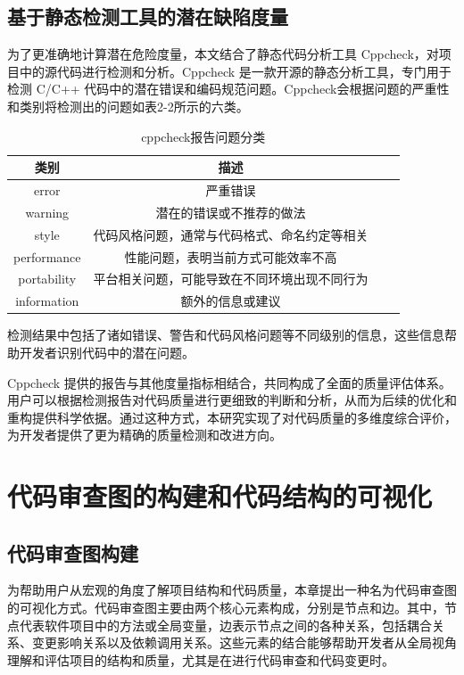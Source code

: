 \subsection{基于静态检测工具的潜在缺陷度量}

为了更准确地计算潜在危险度量，本文结合了静态代码分析工具 Cppcheck，对项目中的源代码进行检测和分析。Cppcheck 是一款开源的静态分析工具，专门用于检测 C/C++ 代码中的潜在错误和编码规范问题。Cppcheck会根据问题的严重性和类别将检测出的问题如表2-2所示的六类。

\begin{table}[htbp]
\caption{cppcheck报告问题分类}
\vspace{0.5em}\centering\wuhao
\begin{tabular}{cccc}
\toprule
类别 & 描述 \\
\midrule
error &  严重错误 \\
warning & 潜在的错误或不推荐的做法 \\
style & 代码风格问题，通常与代码格式、命名约定等相关 \\
performance & 性能问题，表明当前方式可能效率不高 \\ 
portability & 平台相关问题，可能导致在不同环境出现不同行为 \\
information & 额外的信息或建议 \\ 
\bottomrule
\end{tabular}
\end{table}

检测结果中包括了诸如错误、警告和代码风格问题等不同级别的信息，这些信息帮助开发者识别代码中的潜在问题。

Cppcheck 提供的报告与其他度量指标相结合，共同构成了全面的质量评估体系。用户可以根据检测报告对代码质量进行更细致的判断和分析，从而为后续的优化和重构提供科学依据。通过这种方式，本研究实现了对代码质量的多维度综合评价，为开发者提供了更为精确的质量检测和改进方向。



\section{代码审查图的构建和代码结构的可视化}

\subsection{代码审查图构建}

为帮助用户从宏观的角度了解项目结构和代码质量，本章提出一种名为代码审查图的可视化方式。代码审查图主要由两个核心元素构成，分别是节点和边。其中，节点代表软件项目中的方法或全局变量，边表示节点之间的各种关系，包括耦合关系、变更影响关系以及依赖调用关系。这些元素的结合能够帮助开发者从全局视角理解和评估项目的结构和质量，尤其是在进行代码审查和代码变更时。

